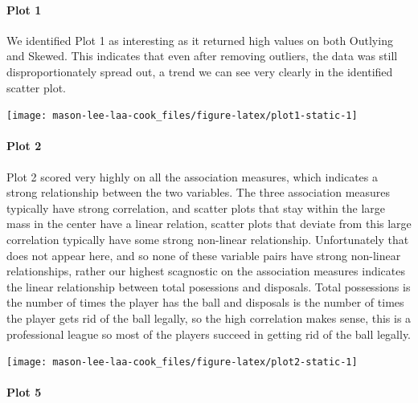 \hypertarget{plot-1}{%
\paragraph{Plot 1}\label{plot-1}}

We identified Plot 1 as interesting as it returned high values on both
Outlying and Skewed. This indicates that even after removing outliers,
the data was still disproportionately spread out, a trend we can see
very clearly in the identified scatter plot.

\begin{Schunk}


\begin{center}\texttt{[image: mason-lee-laa-cook\_files/figure-latex/plot1-static-1]} \end{center}

\end{Schunk}

\hypertarget{plot-2}{%
\paragraph{Plot 2}\label{plot-2}}

Plot 2 scored very highly on all the association measures, which
indicates a strong relationship between the two variables. The three
association measures typically have strong correlation, and scatter
plots that stay within the large mass in the center have a linear
relation, scatter plots that deviate from this large correlation
typically have some strong non-linear relationship. Unfortunately that
does not appear here, and so none of these variable pairs have strong
non-linear relationships, rather our highest scagnostic on the
association measures indicates the linear relationship between total
posessions and disposals. Total possessions is the number of times the
player has the ball and disposals is the number of times the player gets
rid of the ball legally, so the high correlation makes sense, this is a
professional league so most of the players succeed in getting rid of the
ball legally.

\begin{Schunk}


\begin{center}\texttt{[image: mason-lee-laa-cook\_files/figure-latex/plot2-static-1]} \end{center}

\end{Schunk}

\hypertarget{plot-5}{%
\paragraph{Plot 5}\label{plot-5}}

